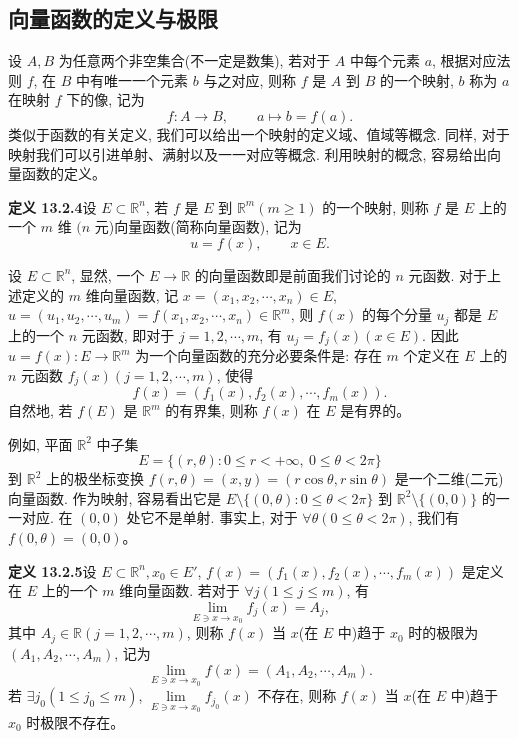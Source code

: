 \documentclass[UTF8, 12pt, fontset=fandol, oneside]{ctexart}
\begin{document}
\subsection{向量函数的定义与极限}

设 $A,B$ 为任意两个非空集合(不一定是数集), 若对于 $A$ 中每个元素 $a$, 根据对应法则 $f$, 在 $B$ 中有唯一一个元素 $b$ 与之对应, 则称 $f$ 是 $A$ 到 $B$ 的一个映射, $b$ 称为 $a$ 在映射 $f$ 下的像, 记为
\[
  f:A\to B,\qquad a\mapsto b=f(a).
\]
类似于函数的有关定义, 我们可以给出一个映射的定义域、值域等概念. 同样, 对于映射我们可以引进单射、满射以及一一对应等概念. 利用映射的概念, 容易给出向量函数的定义。

\noindent\textbf{定义 13.2.4}\quad 设 $E\subset\mathbb R^n$, 若 $f$ 是 $E$ 到 $\mathbb R^m(m\geqslant1)$ 的一个映射, 则称 $f$ 是 $E$ 上的一个 $m$ 维 $(n$ 元)向量函数(简称向量函数), 记为
\[
  u=f(x),\qquad x\in E.
\]

设 $E\subset\mathbb R^n$, 显然, 一个 $E\to\mathbb R$ 的向量函数即是前面我们讨论的 $n$ 元函数. 对于上述定义的 $m$ 维向量函数, 记 $x=(x_1,x_2,\cdots,x_n)\in E$, $u=(u_1,u_2,\cdots,u_m)=f(x_1,x_2,\cdots,x_n)\in\mathbb R^m$, 则 $f(x)$ 的每个分量 $u_j$ 都是 $E$ 上的一个 $n$ 元函数, 即对于 $j=1,2,\cdots,m$, 有 $u_j=f_j(x)(x\in E)$. 因此 $u=f(x):E\to\mathbb R^m$ 为一个向量函数的充分必要条件是: 存在 $m$ 个定义在 $E$ 上的 $n$ 元函数 $f_j(x)(j=1,2,\cdots,m)$, 使得
\[
  f(x)=(f_1(x),f_2(x),\cdots,f_m(x)).
\]
自然地, 若 $f(E)$ 是 $\mathbb R^m$ 的有界集, 则称 $f(x)$ 在 $E$ 是有界的。

例如, 平面 $\mathbb R^2$ 中子集
\[
  E=\{(r,\theta):0\leqslant r<+\infty,\ 0\leqslant\theta<2\pi\}
\]
到 $\mathbb R^2$ 上的极坐标变换 $f(r,\theta)=(x,y)=(r\cos\theta,r\sin\theta)$ 是一个二维(二元)向量函数. 作为映射, 容易看出它是 $E\setminus\{(0,\theta):0\leqslant\theta<2\pi\}$ 到 $\mathbb R^2\setminus\{(0,0)\}$ 的一一对应. 在 $(0,0)$ 处它不是单射. 事实上, 对于 $\forall\theta(0\leqslant\theta<2\pi)$, 我们有 $f(0,\theta)=(0,0)$。

\noindent\textbf{定义 13.2.5}\quad 设 $E\subset\mathbb R^n,x_0\in E'$, $f(x)=(f_1(x),f_2(x),\cdots,f_m(x))$ 是定义在 $E$ 上的一个 $m$ 维向量函数. 若对于 $\forall j(1\leqslant j\leqslant m)$, 有
\[
  \lim_{E\ni x\to x_0}f_j(x)=A_j,
\]
其中 $A_j\in\mathbb R(j=1,2,\cdots,m)$, 则称 $f(x)$ 当 $x$(在 $E$ 中)趋于 $x_0$ 时的极限为 $(A_1,A_2,\cdots,A_m)$, 记为
\[
  \lim_{E\ni x\to x_0}f(x)=(A_1,A_2,\cdots,A_m).
\]
若 $\exists j_0(1\leqslant j_0\leqslant m)$, $\lim\limits_{E\ni x\to x_0}f_{j_0}(x)$ 不存在, 则称 $f(x)$ 当 $x$(在 $E$ 中)趋于 $x_0$ 时极限不存在。
\end{document}
